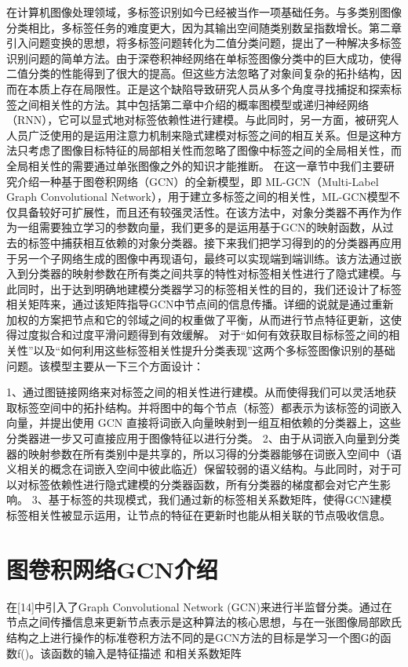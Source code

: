 在计算机图像处理领域，多标签识别如今已经被当作一项基础任务。与多类别图像分类相比，多标签任务的难度更大，因为其输出空间随类别数呈指数增长。第二章引入问题变换的思想，将多标签问题转化为二值分类问题，提出了一种解决多标签识别问题的简单方法。由于深卷积神经网络在单标签图像分类中的巨大成功，使得二值分类的性能得到了很大的提高。但这些方法忽略了对象间复杂的拓扑结构，因而在本质上存在局限性。正是这个缺陷导致研究人员从多个角度寻找捕捉和探索标签之间相关性的方法。其中包括第二章中介绍的概率图模型或递归神经网络（RNN），它可以显式地对标签依赖性进行建模。与此同时，另一方面，被研究人人员广泛使用的是运用注意力机制来隐式建模对标签之间的相互关系。但是这种方法只考虑了图像目标特征的局部相关性而忽略了图像中标签之间的全局相关性，而全局相关性的需要通过单张图像之外的知识才能推断。
在这一章节中我们主要研究介绍一种基于图卷积网络（GCN）的全新模型，即 ML-GCN（Multi-Label Graph Convolutional Network），用于建立多标签之间的相关性，ML-GCN模型不仅具备较好可扩展性，而且还有较强灵活性。在该方法中，对象分类器不再作为作为一组需要独立学习的参数向量，我们更多的是运用基于GCN的映射函数，从过去的标签中捕获相互依赖的对象分类器。接下来我们把学习得到的的分类器再应用于另一个子网络生成的图像中再现语句，最终可以实现端到端训练。该方法通过嵌入到分类器的映射参数在所有类之间共享的特性对标签相关性进行了隐式建模。与此同时，出于达到明确地建模分类器学习的标签相关性的目的，我们还设计了标签相关矩阵来，通过该矩阵指导GCN中节点间的信息传播。详细的说就是通过重新加权的方案把节点和它的邻域之间的权重做了平衡，从而进行节点特征更新，这使得过度拟合和过度平滑问题得到有效缓解。
对于“如何有效获取目标标签之间的相关性”以及“如何利用这些标签相关性提升分类表现”这两个多标签图像识别的基础问题。该模型主要从一下三个方面设计：

1、通过图链接网络来对标签之间的相关性进行建模。从而使得我们可以灵活地获取标签空间中的拓扑结构。并将图中的每个节点（标签）都表示为该标签的词嵌入向量，并提出使用 GCN 直接将词嵌入向量映射到一组互相依赖的分类器上，这些分类器进一步又可直接应用于图像特征以进行分类。
2、由于从词嵌入向量到分类器的映射参数在所有类别中是共享的，所以习得的分类器能够在词嵌入空间中（语义相关的概念在词嵌入空间中彼此临近）保留较弱的语义结构。与此同时，对于可以对标签依赖性进行隐式建模的分类器函数，所有分类器的梯度都会对它产生影响。
3、基于标签的共现模式，我们通过新的标签相关系数矩阵，使得GCN建模标签相关性被显示运用，让节点的特征在更新时也能从相关联的节点吸收信息。

\section{图卷积网络GCN介绍}
在[14]中引入了Graph Convolutional Network (GCN)来进行半监督分类。通过在节点之间传播信息来更新节点表示是这种算法的核心思想，与在一张图像局部欧氏结构之上进行操作的标准卷积方法不同的是GCN方法的目标是学习一个图G的函数f()。该函数的输入是特征描述  和相关系数矩阵

